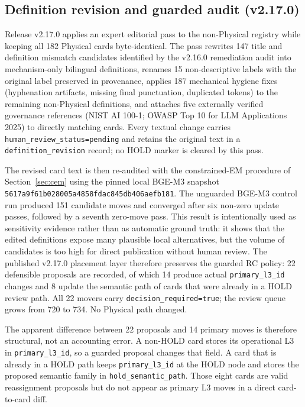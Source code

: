 \documentclass[11pt,a4paper]{article}
\newcommand{\code}[1]{\texttt{#1}}
\begin{document}
\subsection{Definition revision and guarded audit (v2.17.0)}

Release v2.17.0 applies an expert editorial pass to the non-Physical registry
while keeping all 182 Physical cards byte-identical. The pass rewrites 147
title and definition mismatch candidates identified by the v2.16.0 remediation
audit into mechanism-only bilingual definitions, renames 15 non-descriptive
labels with the original label preserved in provenance, applies 187 mechanical
hygiene fixes (hyphenation artifacts, missing final punctuation, duplicated
tokens) to the remaining non-Physical definitions, and attaches five
externally verified governance references (NIST AI 100-1; OWASP Top 10 for LLM
Applications 2025) to directly matching cards. Every textual change carries
\code{human\_review\_status=pending} and retains the original text in a
\code{definition\_revision} record; no HOLD marker is cleared by this pass.

The revised card text is then re-audited with the constrained-EM procedure of Section~\ref{sec:cem} using the pinned local BGE-M3 snapshot
\code{5617a9f61b028005a4858fdac845db406aefb181}. The unguarded BGE-M3 control
run produced 151 candidate moves and converged after six non-zero update
passes, followed by a seventh zero-move pass. This result is intentionally
used as sensitivity evidence rather than as automatic ground truth: it shows
that the edited definitions expose many plausible local alternatives, but the
volume of candidates is too high for direct publication without human review.
The published v2.17.0 placement layer therefore preserves the guarded RC
policy: 22 defensible proposals are recorded, of which 14 produce actual
\code{primary\_l3\_id} changes and 8 update the semantic path of cards that
were already in a HOLD review path. All 22 movers carry
\code{decision\_required=true}; the review queue grows from 720 to 734. No
Physical path changed.

The apparent difference between 22 proposals and 14 primary moves is therefore
structural, not an accounting error. A non-HOLD card stores its operational L3
in \code{primary\_l3\_id}, so a guarded proposal changes that field. A card
that is already in a HOLD path keeps \code{primary\_l3\_id} at the HOLD node
and stores the proposed semantic family in \code{hold\_semantic\_path}. Those
eight cards are valid reassignment proposals but do not appear as primary L3
moves in a direct card-to-card diff.
\end{document}
